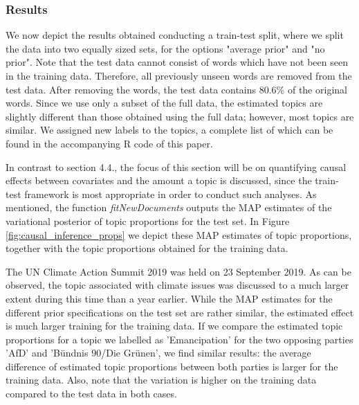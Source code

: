 \subsubsection{Results}

We now depict the results obtained conducting a train-test split, where we split the data into two equally sized sets, for the options "average prior" and "no prior". Note that the test data cannot consist of words which have not been seen in the training data. Therefore, all previously unseen words are removed from the test data. After removing the words, the test data contains 80.6\% of the original words. Since we use only a subset of the full data, the estimated topics are slightly different than those obtained using the full data; however, most topics are similar. We assigned new labels to the topics, a complete list of which can be found in the accompanying R code of this paper.

In contrast to section 4.4., the focus of this section will be on quantifying causal effects between covariates and the amount a topic is discussed, since the train-test framework is most appropriate in order to conduct such analyses. As mentioned, the function \textit{fitNewDocuments} outputs the MAP estimates of the variational posterior of topic proportions for the test set. In Figure \ref{fig:causal_inference_props} we depict these MAP estimates of topic proportions, together with the topic proportions obtained for the training data.

The UN Climate Action Summit 2019 was held on 23 September 2019. As can be observed, the topic associated with climate issues was discussed to a much larger extent during this time than a year earlier. While the MAP estimates for the different prior specifications on the test set are rather similar, the estimated effect is much larger training for the training data. If we compare the estimated topic proportions for a topic we labelled as 'Emancipation' for the two opposing parties 'AfD' and 'B{\"u}ndnis 90/Die Gr{\"u}nen', we find similar results: the average difference of estimated topic proportions between both parties is larger for the training data. Also, note that the variation is higher on the training data compared to the test data in both cases.

